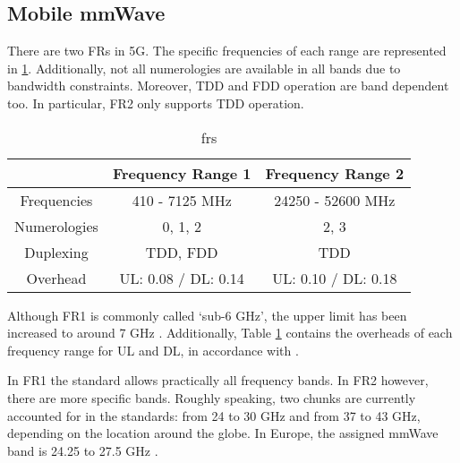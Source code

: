 \subsection*{Mobile mmWave}

There are two \acp{FR} in 5G. The specific frequencies of each range are represented in \ref{tab:frs}. Additionally, not all numerologies are available in all bands due to bandwidth constraints. Moreover, \ac{TDD} and \ac{FDD} operation are band dependent too. In particular, FR2 only supports \ac{TDD} operation.

\begin{table}[h]
    \centering
    \caption{frs}
    \label{tab:frs}
    \begin{tabular}{c|c|c|}
        \cline{2-3}
        \multicolumn{1}{l|}{}              & Frequency Range 1 & Frequency Range 2 \\ \hline
        \multicolumn{1}{|c|}{Frequencies}  & 410 - 7125 MHz    & 24250 - 52600 MHz \\ \hline
        \multicolumn{1}{|c|}{Numerologies} & 0, 1, 2        & 2, 3           \\ \hline
        \multicolumn{1}{|c|}{Duplexing}    & TDD, FDD       & TDD               \\ \hline
        \multicolumn{1}{|c|}{Overhead}    & UL: 0.08 / DL: 0.14      & UL: 0.10 / DL: 0.18               \\ \hline
    \end{tabular}
\end{table}




Although \ac{FR}1 is commonly called `sub-6 GHz', the upper limit has been increased to around 7 GHz \cite{3gpp_bands}. Additionally, Table \ref{tab:frs} contains the overheads of each frequency range for UL and DL, in accordance with \cite{3gpp_overheads}.



In FR1 the standard allows practically all frequency bands. In FR2 however, there are more specific bands. Roughly speaking, two chunks are currently accounted for in the standards: from 24 to 30 GHz and from 37 to 43 GHz, depending on the location around the globe. In Europe, the assigned mmWave band is 24.25 to 27.5 GHz \cite{5g_2020}.